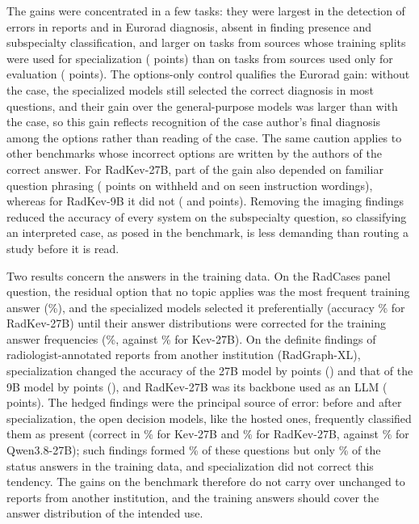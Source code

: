 The gains were concentrated in a few tasks: they were largest in the detection of errors in reports and in Eurorad diagnosis, absent in finding presence and subspecialty classification, and larger on tasks from sources whose training splits were used for specialization ( points) than on tasks from sources used only for evaluation ( points). The options-only control qualifies the Eurorad gain: without the case, the specialized models still selected the correct diagnosis in most questions, and their gain over the general-purpose models was larger than with the case, so this gain reflects recognition of the case author's final diagnosis among the options rather than reading of the case. The same caution applies to other benchmarks whose incorrect options are written by the authors of the correct answer. %
For RadKev-27B, part of the gain also depended on familiar question phrasing ( points on withheld and  on seen instruction wordings), whereas for RadKev-9B it did not ( and  points). %
Removing the imaging findings reduced the accuracy of every system on the subspecialty question, so classifying an interpreted case, as posed in the benchmark, is less demanding than routing a study before it is read. %

Two results concern the answers in the training data. On the RadCases panel question, the residual option that no topic applies was the most frequent training answer (\%), and the specialized models selected it preferentially (accuracy \% for RadKev-27B) until their answer distributions were corrected for the training answer frequencies (\%, against \% for Kev-27B). %
On the definite findings of radiologist-annotated reports from another institution (RadGraph-XL), specialization changed the accuracy of the 27B model by  points () and that of the 9B model by  points (), and RadKev-27B was  its backbone used as an LLM ( points). The hedged findings were the principal source of error: before and after specialization, the open decision models, like the hosted ones, frequently classified them as present (correct in \% for Kev-27B and \% for RadKev-27B, against \% for Qwen3.8-27B); such findings formed \% of these questions but only \% of the status answers in the training data, and specialization did not correct this tendency. The gains on the benchmark therefore do not carry over unchanged to reports from another institution, and the training answers should cover the answer distribution of the intended use. %


